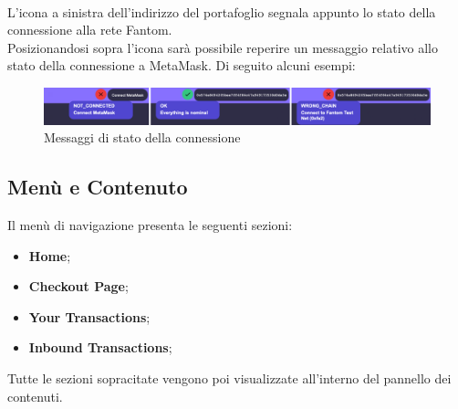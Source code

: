     \textbf{}\\
    L'icona a sinistra dell'indirizzo del portafoglio segnala appunto lo stato della connessione alla rete Fantom\glo{}.\\
    Posizionandosi sopra l'icona sarà possibile reperire un messaggio relativo allo stato della connessione a MetaMask. Di seguito alcuni esempi:
    \begin{figure}[H]
        \centering
        \includegraphics[scale=0.3]{immagini/stateSignal.png}
        \caption{Messaggi di stato della connessione}
    \end{figure}

    \subsection{Menù e Contenuto} \label{subsection:Menu_E_Contenuto}
    Il menù di navigazione presenta le seguenti sezioni:
    \begin{itemize}
        \item \textbf{Home};
        \item \textbf{Checkout Page};
        \item \textbf{Your Transactions};
        \item \textbf{Inbound Transactions};
    \end{itemize}

    Tutte le sezioni sopracitate vengono poi visualizzate all'interno del pannello dei contenuti.

    

